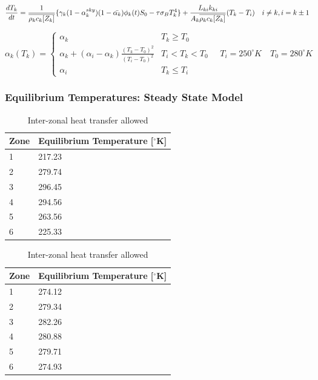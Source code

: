 \documentclass[12pt]{article}
\newcommand*\mean[1]{\overline{#1}}
\begin{document}
\begin{equation} \label{eqn:dtkphi}
  \frac{dT_k}{dt} = \frac{1}{\mean{\rho_kc_k[Z_k]}}
  \{
    \gamma_k(1-\alpha_k^{sky})(1-\Bar{\alpha_k})\phi_k(t)S_0-\tau\sigma_BT_k^{4}
  \} +
  \frac{L_{ki}k_{ki}}{{A_k}\mean{\rho_kc_k[Z_k]}}(T_{k}-T_{i})
  \quad i \neq k, i = k \pm 1
\end{equation}

\begin{equation} \label{eqn:albedoparam}
  \alpha_k(T_k) =
    \begin{cases}
    \alpha_k & T_k \geq T_0 \\
    \alpha_k + (\alpha_i-\alpha_k)\frac{(T_k-T_0)^2}{(T_i-T_0)^2}
    & T_i < T_k < T_0 \\
    \alpha_i & T_k \leq T_i
    \end{cases}
    \quad T_i = 250^{\circ}K \quad T_0 = 280^{\circ}K
\end{equation}

\subsubsection{Equilibrium Temperatures: Steady State Model}
\begin{table}[H]
    \parbox{.45\linewidth}{
    \captionsetup{singlelinecheck = false, justification=justified}
    \caption{Inter-zonal heat transfer suppressed}
    \begin{tabular}{ll}
    \hline
    Zone & Equilibrium Temperature [$^{\circ}$K] \\
    \hline
    1 & 217.23 \\
    2 & 279.74 \\
    3 & 296.45 \\
    4 & 294.56 \\ 
    5 & 263.56 \\
    6 & 225.33 \\
    \end{tabular}
    \label{tab:supressedteq}
    }
\hfill
    \parbox{.45\linewidth}{
    \captionsetup{singlelinecheck = false, justification=justified}
    \caption{Inter-zonal heat transfer allowed}
    \begin{tabular}{ll}
    \hline
    Zone & Equilibrium Temperature [$^{\circ}$K] \\
    \hline
    1 & 274.12 \\
    2 & 279.34 \\
    3 & 282.26 \\
    4 & 280.88 \\ 
    5 & 279.71 \\
    6 & 274.93 \\
    \end{tabular}
    \label{tab:teq}
    }
\end{table}
\FloatBarrier
\end{document}
